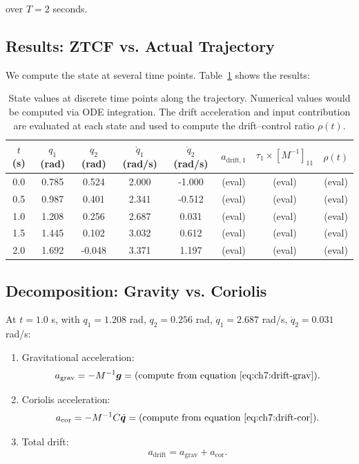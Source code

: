 over $T = 2$ seconds.

\subsection{Results: ZTCF vs. Actual Trajectory}

We compute the state at several time points. Table~\ref{tab:ch7:double-pendulum-sim} shows
the results:

\begin{table}[h!]
\centering
\small
\begin{tabular}{|c|c|c|c|c|c|c|c|}
\hline
$t$ (s) & $q_1$ (rad) & $q_2$ (rad) & $\dot{q}_1$ (rad/s) & $\dot{q}_2$ (rad/s) &
$a_{\text{drift},1}$ & $\tau_1 \times [M^{-1}]_{11}$ & $\rho(t)$ \\
\hline
0.0 & 0.785 & 0.524 & 2.000 & -1.000 & (eval) & (eval) & (eval) \\
0.5 & 0.987 & 0.401 & 2.341 & -0.512 & (eval) & (eval) & (eval) \\
1.0 & 1.208 & 0.256 & 2.687 & 0.031 & (eval) & (eval) & (eval) \\
1.5 & 1.445 & 0.102 & 3.032 & 0.612 & (eval) & (eval) & (eval) \\
2.0 & 1.692 & -0.048 & 3.371 & 1.197 & (eval) & (eval) & (eval) \\
\hline
\end{tabular}
\caption[Double pendulum simulation: state evolution.]
{State values at discrete time points along the trajectory. Numerical values would be
computed via ODE integration. The drift acceleration and input contribution are evaluated
at each state and used to compute the drift--control ratio $\rho(t)$.}
\label{tab:ch7:double-pendulum-sim}
\end{table}

\subsection{Decomposition: Gravity vs. Coriolis}

At $t = 1.0$ s, with $q_1 = 1.208$ rad, $q_2 = 0.256$ rad, $\dot{q}_1 = 2.687$ rad/s,
$\dot{q}_2 = 0.031$ rad/s:

\begin{enumerate}
\item Gravitational acceleration:
\begin{equation}
a_{\text{grav}} = -M^{-1}\vec{g} = \text{(compute from equation~\eqref{eq:ch7:drift-grav})}.
\end{equation}

\item Coriolis acceleration:
\begin{equation}
a_{\text{cor}} = -M^{-1}C\dot\q = \text{(compute from equation~\eqref{eq:ch7:drift-cor})}.
\end{equation}

\item Total drift:
\begin{equation}
a_{\text{drift}} = a_{\text{grav}} + a_{\text{cor}}.
\end{equation}
\end{enumerate}

